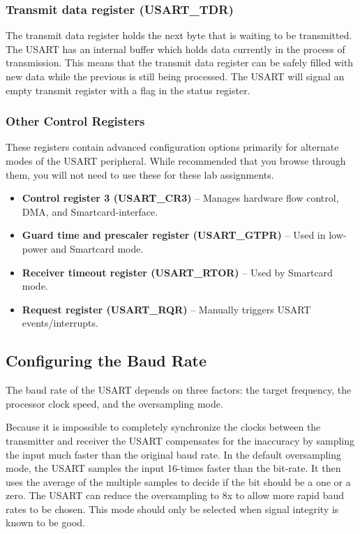 \documentclass[openany,11pt,fleqn]{book} %
\begin{document}
\subsubsection{Transmit data register (USART\_TDR)}
The transmit data register holds the next byte that is waiting to be transmitted. The USART has an internal buffer which holds data currently in the process of transmission. This means that the transmit data register can be safely filled with new data while the previous is still being processed. The USART will signal an empty transmit register with a flag in the status register. 

\subsubsection{Other Control Registers}
These registers contain advanced configuration options primarily for alternate modes of the USART peripheral. While recommended that you browse through them, you will not need to use these for these lab assignments.



\begin{itemize}
    \item \textbf{Control register 3 (USART\_CR3)} -- Manages hardware flow control, DMA, and Smartcard-interface. 
    \item \textbf{Guard time and prescaler register (USART\_GTPR)} -- Used in low-power and Smartcard mode. 
    \item \textbf{Receiver timeout register (USART\_RTOR)} -- Used by Smartcard mode. 
    \item \textbf{Request register (USART\_RQR)} -- Manually triggers USART events/interrupts. 
\end{itemize}

\subsection{Configuring the Baud Rate}	
The baud rate of the USART depends on three factors: the target frequency, the processor clock speed, and the oversampling mode.

Because it is impossible to completely synchronize the clocks between the transmitter and receiver the USART compensates for the inaccuracy by sampling the input much faster than the original baud rate. In the default oversampling mode, the USART samples the input 16-times faster than the bit-rate. It then uses the average of the multiple samples to decide if the bit should be a one or a zero. The USART can reduce the oversampling to 8x to allow more rapid baud rates to be chosen. This mode should only be selected when signal integrity is known to be good.
\end{document}
